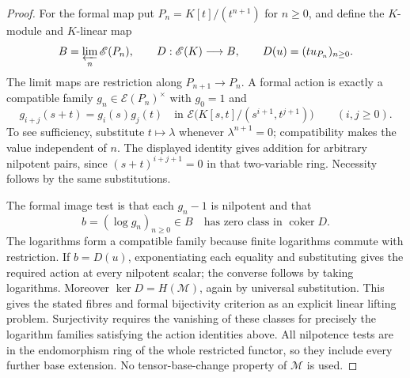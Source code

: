 \begin{proof}
For the formal map put $P_n=K[t]/(t^{n+1})$ for $n\geq0$, and define
the $K$-module and $K$-linear map
\[
 B=\varprojlim_n\mathscr E(P_n),\qquad
 D:\mathscr E(K)\longrightarrow B,
       \qquad D(u)=(t u_{P_n})_{n\geq0}.
\]
The limit maps are restriction along $P_{n+1}\to P_n$.
A formal action is exactly a compatible family
$g_n\in\mathscr E(P_n)^\times$ with $g_0=1$ and
\[
 g_{i+j}(s+t)=g_i(s)g_j(t)
 \quad\text{in }\mathscr E\bigl(K[s,t]/(s^{i+1},t^{j+1})\bigr)
 \qquad(i,j\geq0).
\]
To see sufficiency, substitute $t\mapsto\lambda$ whenever
$\lambda^{n+1}=0$; compatibility makes the value independent of $n$.
The displayed identity gives addition for arbitrary nilpotent pairs,
since $(s+t)^{i+j+1}=0$ in that two-variable ring. Necessity follows by
the same substitutions.

The formal image test is that each $g_n-1$ is nilpotent and that
\[
 b=(\log g_n)_{n\geq0}\in B
           \quad\text{has zero class in }\operatorname{coker}D.
\]
The logarithms form a compatible family because finite logarithms
commute with restriction. If $b=D(u)$, exponentiating each equality
and substituting gives the required action at every nilpotent scalar;
the converse follows by taking logarithms. Moreover
$\ker D=H(\mathcal M)$, again by universal substitution. This gives
the stated fibres and formal bijectivity criterion as an explicit
linear lifting problem. Surjectivity requires the vanishing of these
classes for precisely the logarithm families satisfying the action
identities above. All nilpotence tests are in the endomorphism ring of
the whole restricted functor, so they include every further base
extension. No tensor-base-change property of $\mathcal M$ is used.
\end{proof}

